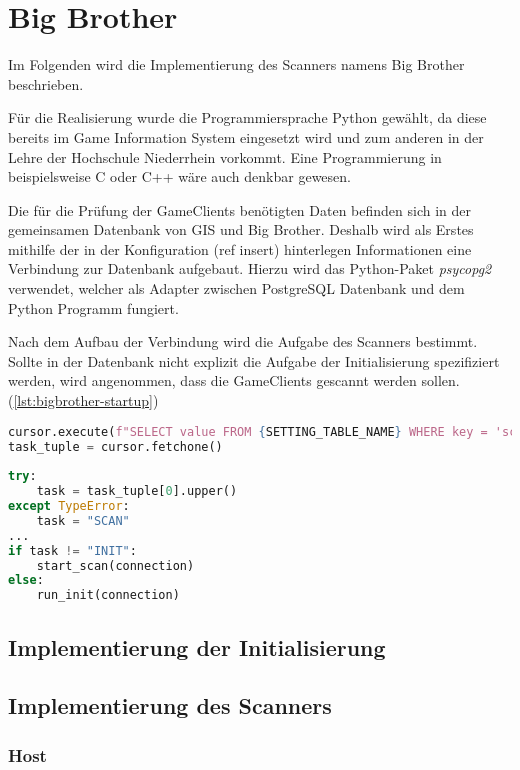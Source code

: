 \section{Big Brother}

Im Folgenden wird die Implementierung des Scanners namens Big Brother beschrieben.

Für die Realisierung wurde die Programmiersprache Python gewählt, da diese bereits im Game Information System eingesetzt wird und zum anderen in der Lehre der Hochschule Niederrhein vorkommt. Eine Programmierung in beispielsweise C oder C++ wäre auch denkbar gewesen.

Die für die Prüfung der GameClients benötigten Daten befinden sich in der gemeinsamen Datenbank von GIS und Big Brother. Deshalb wird als Erstes mithilfe der in der Konfiguration (ref insert) hinterlegen Informationen eine Verbindung zur Datenbank aufgebaut. Hierzu wird das Python-Paket \textit{psycopg2} verwendet, welcher als Adapter zwischen PostgreSQL Datenbank und dem Python Programm fungiert. 

Nach dem Aufbau der Verbindung wird die Aufgabe des Scanners bestimmt. Sollte in der Datenbank nicht explizit die Aufgabe der Initialisierung spezifiziert werden, wird angenommen, dass die GameClients gescannt werden sollen. (\ref{lst:bigbrother-startup})

\begin{lstlisting}[language=Python, frame=single, caption={todo}, captionpos=b, label={lst:bigbrother-startup}]
cursor.execute(f"SELECT value FROM {SETTING_TABLE_NAME} WHERE key = 'scanner.task'")
task_tuple = cursor.fetchone()
	
try:
	task = task_tuple[0].upper()
except TypeError:
	task = "SCAN"
...
if task != "INIT":
	start_scan(connection)
else:
	run_init(connection)	
\end{lstlisting}


\subsection{Implementierung der Initialisierung}

\subsection{Implementierung des Scanners}

\subsubsection{Host}

